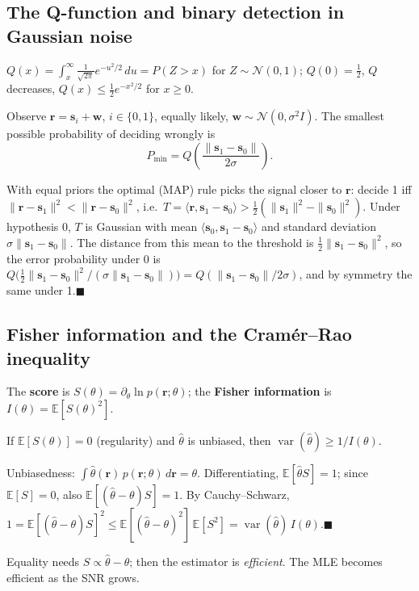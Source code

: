 \documentclass[11pt,a4paper]{article}
\newcommand{\E}{\mathbb{E}}
\newcommand{\var}{\operatorname{var}}
\newcommand{\bs}{\mathbf{s}}
\newcommand{\br}{\mathbf{r}}
\newcommand{\bw}{\mathbf{w}}
\begin{document}
\subsection{The Q-function and binary detection in Gaussian noise}\label{sec:detection}
$Q(x)=\int_x^\infty \frac{1}{\sqrt{2\pi}}e^{-u^2/2}\,du=P(Z>x)$ for $Z\sim\mathcal N(0,1)$; $Q(0)=\tfrac12$, $Q$ decreases,
$Q(x)\le\tfrac12e^{-x^2/2}$ for $x\ge0$.
\begin{resultbox}
Observe $\br=\bs_i+\bw$, $i\in\{0,1\}$, equally likely, $\bw\sim\mathcal N(0,\sigma^2 I)$. The smallest possible
probability of deciding wrongly is
\begin{equation}
  P_{\min}=Q\!\left(\frac{\|\bs_1-\bs_0\|}{2\sigma}\right).
\end{equation}
\end{resultbox}
\begin{proofbox}
With equal priors the optimal (MAP) rule picks the signal closer to $\br$: decide 1 iff
$\|\br-\bs_1\|^2<\|\br-\bs_0\|^2$, i.e.\ $T=\langle\br,\bs_1-\bs_0\rangle>\tfrac12(\|\bs_1\|^2-\|\bs_0\|^2)$.
Under hypothesis 0, $T$ is Gaussian with mean $\langle\bs_0,\bs_1-\bs_0\rangle$ and standard deviation
$\sigma\|\bs_1-\bs_0\|$. The distance from this mean to the threshold is $\tfrac12\|\bs_1-\bs_0\|^2$, so the error probability
under 0 is $Q\big(\tfrac12\|\bs_1-\bs_0\|^2/(\sigma\|\bs_1-\bs_0\|)\big)=Q(\|\bs_1-\bs_0\|/2\sigma)$, and by symmetry the same
under 1.\hfill$\blacksquare$
\end{proofbox}

\subsection{Fisher information and the Cramér--Rao inequality}\label{sec:crlbthm}
The \textbf{score} is $S(\theta)=\partial_\theta\ln p(\br;\theta)$; the \textbf{Fisher information} is $I(\theta)=\E[S(\theta)^2]$.
\begin{resultbox}
If $\E[S(\theta)]=0$ (regularity) and $\hat\theta$ is unbiased, then $\var(\hat\theta)\ge 1/I(\theta)$.
\end{resultbox}
\begin{proofbox}
Unbiasedness: $\int\hat\theta(\br)\,p(\br;\theta)\,d\br=\theta$. Differentiating, $\E[\hat\theta S]=1$; since $\E[S]=0$,
also $\E[(\hat\theta-\theta)S]=1$. By Cauchy--Schwarz,
$1=\E[(\hat\theta-\theta)S]^2\le\E[(\hat\theta-\theta)^2]\,\E[S^2]=\var(\hat\theta)\,I(\theta)$.\hfill$\blacksquare$

Equality needs $S\propto\hat\theta-\theta$; then the estimator is \emph{efficient}. The MLE becomes efficient as the SNR grows.
\end{proofbox}
\end{document}
